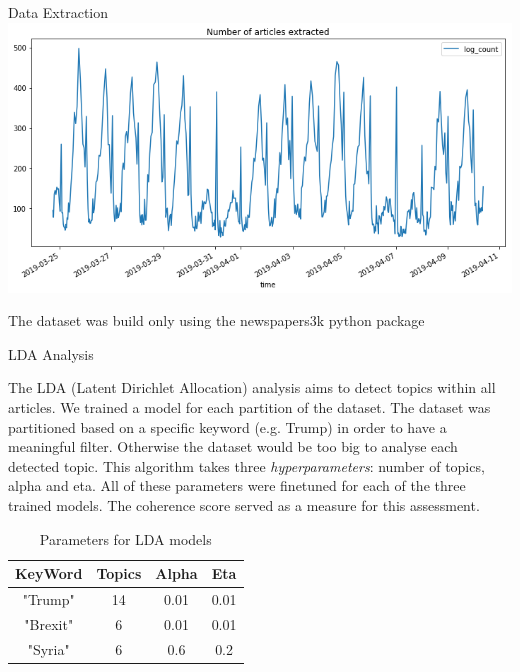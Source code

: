\documentclass[final]{beamer}
\newlength{\onecolwid}
\begin{document}
\begin{frame}[t]
\begin{columns}[t]
\begin{column}{\onecolwid}
\begin{block}{Data Extraction}
    \hfill\includegraphics{log_extraction.png}\hspace*{\fill}

    The dataset was build only using the newspapers3k python package

\end{block}


\begin{block}{LDA Analysis}

    The LDA (Latent Dirichlet Allocation) analysis aims to detect topics within all articles. We trained a model for each partition of the dataset. The dataset was partitioned based on a specific keyword (e.g. Trump) in order to have a meaningful filter. Otherwise the dataset would be too big to analyse each detected topic. This algorithm takes three \textit{hyperparameters}: number of topics, alpha and eta. All of these parameters were finetuned for each of the three trained models. The coherence score served as a measure for this assessment. \linebreak
    
    \begin{table}    
    \begin{tabular}{c c c c}
    \hline
    KeyWord & Topics & Alpha & Eta  \\ [0.5ex]
    \hline\hline
    "Trump" & 14 & 0.01 & 0.01 \\
    "Brexit" & 6 & 0.01 & 0.01 \\
    "Syria" & 6 & 0.6 & 0.2 \\
    \end{tabular}
    \caption{Parameters for LDA models}
    \end{table}
    

\end{block}
\end{column}
\end{columns}
\end{frame}
\end{document}
